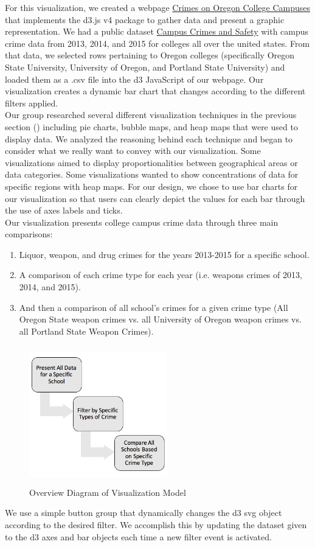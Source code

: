 \documentclass[journal]{vgtc}                %
\begin{document}
For this visualization, we created a webpage \href{http://people.oregonstate.edu/~schrodan/}{Crimes on Oregon College Campuses} that implements the d3.js v4 package to gather data and present a graphic representation. We had a public dataset \href{https://ope.ed.gov/campussafety/#/}{Campus Crimes and Safety} with campus crime data from 2013, 2014, and 2015 for colleges all over the united states. From that data, we selected rows pertaining to Oregon colleges (specifically Oregon State University, University of Oregon, and Portland State University) and loaded them as a .csv file into the d3 JavaScript of our webpage. Our visualization creates a dynamic bar chart that changes according to the different filters applied.\\
\indent Our group researched several different visualization techniques in the previous section () including pie charts, bubble maps, and heap maps that were used to display data. We analyzed the reasoning behind each technique and began to consider what we really want to convey with our visualization. Some visualizations aimed to display proportionalities between geographical areas or data categories. Some visualizations wanted to show concentrations of data for specific regions with heap maps. For our design, we chose to use bar charts for our visualization so that users can clearly depict the values for each bar through the use of axes labels and ticks.\\
\indent Our visualization presents college campus crime data through three main comparisons:
\begin{enumerate}
	\setlength\itemsep{0em}
	\item Liquor, weapon, and drug crimes for the years 2013-2015 for a specific school.
	\item A comparison of each crime type for each year (i.e. weapons crimes of 2013, 2014, and 2015).
	\item And then a comparison of all school's crimes for a given crime type (All Oregon State weapon crimes vs. all University of Oregon weapon crimes vs. all Portland State Weapon Crimes).
\end{enumerate}

\begin{figure}[H]
\label{fig:OverviewDiagram}
\centering
\includegraphics[width=6cm, height=6cm]{method-flow-chart}
\caption{Overview Diagram of Visualization Model}
\end{figure}
We use a simple button group that dynamically changes the d3 svg object according to the desired filter. We accomplish this by updating the dataset given to the d3 axes and bar objects each time a new filter event is activated. 
\end{document}
